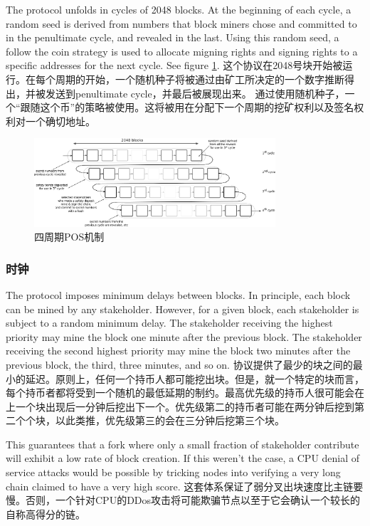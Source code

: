\documentclass[letterpaper]{article}
\begin{document}
The protocol unfolds in cycles of \num{2048} blocks. At the beginning of each
cycle, a random seed is derived from numbers that block miners chose and committed
to in the penultimate cycle, and revealed in the last. Using this random seed,
a follow the coin strategy is used to allocate migning rights and signing rights
to a specific addresses for the next cycle. See figure \ref{fig:pos_figure}.
这个协议在2048号块开始被运行。在每个周期的开始，一个随机种子将被通过由矿工所决定的一个数字推断得出，并被发送到penultimate cycle，并最后被展现出来。
通过使用随机种子，一个“跟随这个币”的策略被使用。这将被用在分配下一个周期的挖矿权利以及签名权利对一个确切地址。

\begin{figure}[b!]
  \centering
  \includegraphics[width=0.8\textwidth]{pos_figure.eps}
  \caption{四周期POS机制}
  \label{fig:pos_figure}
\end{figure}


\subsubsection{时钟}

The protocol imposes minimum delays between blocks. In principle, each block
can be mined by any stakeholder. However, for a given block, each stakeholder
is subject to a random minimum delay. The stakeholder receiving the highest
priority may mine the block one minute after the previous block. The
stakeholder receiving the second highest priority may mine the block two
minutes after the previous block, the third, three minutes, and so on.
协议提供了最少的块之间的最小的延迟。原则上，任何一个持币人都可能挖出块。但是，就一个特定的块而言，每个持币者都将受到一个随机的最低延期的制约。最高优先级的持币人很可能会在上一个块出现后一分钟后挖出下一个。优先级第二的持币者可能在两分钟后挖到第二个个块，以此类推，优先级第三的会在三分钟后挖第三个块。

This guarantees that a fork where only a small fraction of stakeholder
contribute will exhibit a low rate of block creation. If this weren't 
the case, a CPU denial of service attacks would be possible by
tricking nodes into verifying a very long chain claimed to have a very high
score.
这套体系保证了弱分叉出块速度比主链要慢。否则，一个针对CPU的DDos攻击将可能欺骗节点以至于它会确认一个较长的自称高得分的链。
\end{document}
